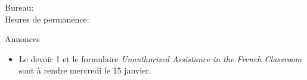 \documentclass{beamer}
\subtitle[Verbes irréguliers et emplois idiomatiques]{Les verbes irréguliers et les emplois idiomatiques}
\begin{document}
  \begin{frame}
    \titlepage
    \tiny{Bureau: \\
          Heures de permanence: }
  \end{frame}

  \begin{frame}{Annonces}
    \begin{itemize}
      \item Le devoir 1 et le formulaire \emph{Unauthorized Assistance in the French Classroom} sont à rendre mercredi le 15 janvier.
    \end{itemize}
  \end{frame}

\end{document}
